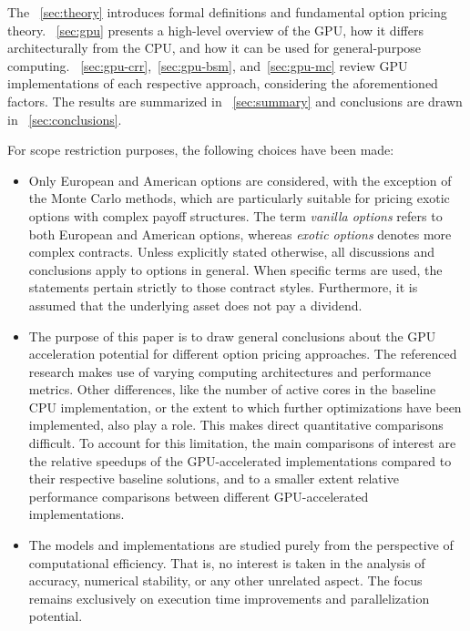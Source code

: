 \documentclass[english,12pt,a4paper,pdftex,sci,utf8]{aaltothesis}
\begin{document}
The ~\cref{sec:theory} introduces formal definitions and fundamental option pricing theory. ~\cref{sec:gpu} presents a high-level overview of the GPU, how it differs architecturally from the CPU, and how it can be used for general-purpose computing. ~\cref{sec:gpu-crr},~\cref{sec:gpu-bsm}, and~\cref{sec:gpu-mc} review GPU implementations of each respective approach, considering the aforementioned factors. The results are summarized in ~\cref{sec:summary} and conclusions are drawn in ~\cref{sec:conclusions}.

For scope restriction purposes, the following choices have been made:
\begin{itemize}
\item Only European and American options are considered, with the exception of the Monte Carlo methods, which are particularly suitable for pricing exotic options with complex payoff structures. The term \emph{vanilla options} refers to both European and American options, whereas \emph{exotic options} denotes more complex contracts. Unless explicitly stated otherwise, all discussions and conclusions apply to options in general. When specific terms are used, the statements pertain strictly to those contract styles. Furthermore, it is assumed that the underlying asset does not pay a dividend.
    
\item The purpose of this paper is to draw general conclusions about the GPU acceleration potential for different option pricing approaches. The referenced research makes use of varying computing architectures and performance metrics. Other differences, like the number of active cores in the baseline CPU implementation, or the extent to which further optimizations have been implemented, also play a role. This makes direct quantitative comparisons difficult. To account for this limitation, the main comparisons of interest are the relative speedups of the GPU-accelerated implementations compared to their respective baseline solutions, and to a smaller extent relative performance comparisons between different GPU-accelerated implementations.
    
\item The models and implementations are studied purely from the perspective of computational efficiency. That is, no interest is taken in the analysis of accuracy, numerical stability, or any other unrelated aspect. The focus remains exclusively on execution time improvements and parallelization potential.

\end{itemize}
\end{document}
